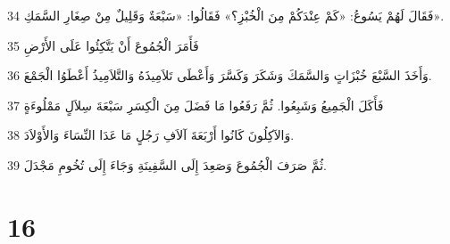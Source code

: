 \par 34 فَقَالَ لَهُمْ يَسُوعُ: «كَمْ عِنْدَكُمْ مِنَ الْخُبْزِ؟» فَقَالُوا: «سَبْعَةٌ وَقَلِيلٌ مِنْ صِغَارِ السَّمَكِ».
\par 35 فَأَمَرَ الْجُمُوعَ أَنْ يَتَّكِئُوا عَلَى الأَرْضِ
\par 36 وَأَخَذَ السَّبْعَ خُبْزَاتٍ وَالسَّمَكَ وَشَكَرَ وَكَسَّرَ وَأَعْطَى تَلاَمِيذَهُ وَالتَّلاَمِيذُ أَعْطَوُا الْجَمْعَ.
\par 37 فَأَكَلَ الْجَمِيعُ وَشَبِعُوا. ثُمَّ رَفَعُوا مَا فَضَلَ مِنَ الْكِسَرِ سَبْعَةَ سِلاَلٍ مَمْلُوءَةٍ
\par 38 وَالآكِلُونَ كَانُوا أَرْبَعَةَ آلاَفِ رَجُلٍ مَا عَدَا النِّسَاءَ وَالأَوْلاَدَ.
\par 39 ثُمَّ صَرَفَ الْجُمُوعَ وَصَعِدَ إِلَى السَّفِينَةِ وَجَاءَ إِلَى تُخُومِ مَجْدَلَ.

\chapter{16}

